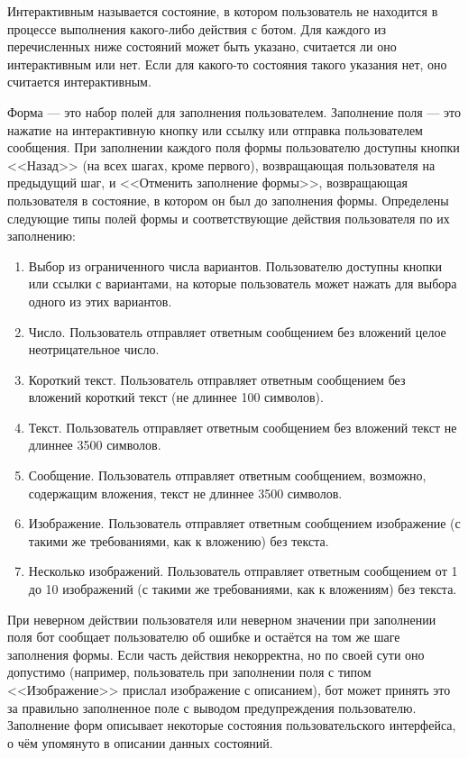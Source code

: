     Интерактивным называется состояние, в котором пользователь не находится в процессе выполнения
    какого-либо действия с ботом. Для каждого из перечисленных ниже состояний может быть указано,
    считается ли оно интерактивным или нет. Если для какого-то состояния такого указания нет,
    оно считается интерактивным.

    Форма --- это набор полей для заполнения пользователем.  Заполнение поля --- это нажатие на
    интерактивную кнопку или ссылку или отправка пользователем сообщения. При заполнении
    каждого поля формы пользователю доступны кнопки <<Назад>> (на всех шагах, кроме первого),
    возвращающая пользователя на предыдущий шаг, и <<Отменить заполнение формы>>, возвращающая
    пользователя в состояние, в котором он был до заполнения формы. Определены следующие типы
    полей формы и соответствующие действия пользователя по их заполнению:
    \begin{enumerate}
        \item
            Выбор из ограниченного числа вариантов.
            Пользователю доступны кнопки или ссылки с вариантами, на которые пользователь может нажать
            для выбора одного из этих вариантов.
        \item
            Число.
            Пользователь отправляет ответным сообщением без вложений целое неотрицательное число.
        \item
            Короткий текст.
            Пользователь отправляет ответным сообщением без вложений короткий текст (не длиннее 100 символов).
        \item
            Текст.
            Пользователь отправляет ответным сообщением без вложений текст не длиннее 3500 символов.
        \item
            Сообщение.
            Пользователь отправляет ответным сообщением, возможно, содержащим вложения, текст не длиннее 3500
            символов.
        \item
            Изображение.
            Пользователь отправляет ответным сообщением изображение (с такими же требованиями, как к вложению)
            без текста.
        \item
            Несколько изображений.
            Пользователь отправляет ответным сообщением от 1 до 10 изображений
            (с такими же требованиями, как к вложениям)
            без текста.
    \end{enumerate}
    При неверном действии пользователя или неверном значении при заполнении поля бот сообщает пользователю
    об ошибке и остаётся на том же шаге заполнения формы. Если часть действия некорректна, но по своей сути
    оно допустимо (например, пользователь при заполнении поля с типом <<Изображение>> прислал изображение с
    описанием), бот может принять это за правильно заполненное поле с выводом предупреждения пользователю.
    Заполнение форм описывает некоторые состояния пользовательского интерфейса, о чём упомянуто в описании
    данных состояний.

